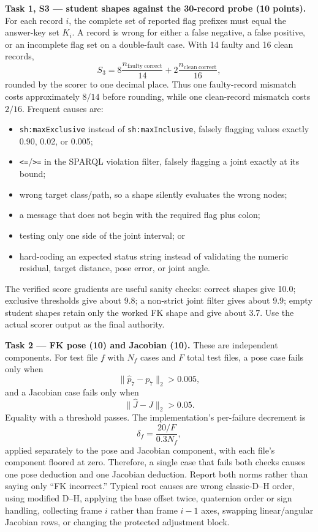 \documentclass[11pt]{article}
\newcommand{\code}[1]{\nolinkurl{#1}}
\begin{document}
\begin{tutornote}
\medskip
\textbf{Task 1, S3 --- student shapes against the 30-record probe (10 points).}
For each record \(i\), the complete set of reported flag prefixes must equal
the answer-key set \(K_i\). A record is wrong for either a false negative, a
false positive, or an incomplete flag set on a double-fault case. With 14
faulty and 16 clean records,
\[
S_3=8\frac{n_{\mathrm{faulty\ correct}}}{14}
   +2\frac{n_{\mathrm{clean\ correct}}}{16},
\]
rounded by the scorer to one decimal place. Thus one faulty-record mismatch
costs approximately \(8/14\) before rounding, while one clean-record mismatch
costs \(2/16\). Frequent causes are:
\begin{itemize}
  \item \code{sh:maxExclusive} instead of \code{sh:maxInclusive}, falsely
    flagging values exactly 0.90, 0.02, or 0.005;
  \item \code{<=}/\code{>=} in the SPARQL violation filter, falsely flagging a
    joint exactly at its bound;
  \item wrong target class/path, so a shape silently evaluates the wrong nodes;
  \item a message that does not begin with the required flag plus colon;
  \item testing only one side of the joint interval; or
  \item hard-coding an expected status string instead of validating the numeric
    residual, target distance, pose error, or joint angle.
\end{itemize}
The verified score gradients are useful sanity checks: correct shapes give
10.0; exclusive thresholds give about 9.8; a non-strict joint filter gives
about 9.9; empty student shapes retain only the worked FK shape and give about
3.7. Use the actual scorer output as the final authority.

\medskip
\textbf{Task 2 --- FK pose (10) and Jacobian (10).}
These are independent components. For test file \(f\) with \(N_f\) cases and
\(F\) total test files, a pose case fails only when
\[
\lVert\hat p_7-p_7\rVert_2>0.005,
\]
and a Jacobian case fails only when
\[
\lVert\hat J-J\rVert_2>0.05.
\]
Equality with a threshold passes. The implementation's per-failure decrement
is
\[
\delta_f=\frac{20/F}{0.3N_f},
\]
applied separately to the pose and Jacobian component, with each file's
component floored at zero. Therefore, a single case that fails both checks
causes one pose deduction and one Jacobian deduction. Report both norms rather
than saying only ``FK incorrect.'' Typical root causes are wrong classic-D--H
order, using modified D--H, applying the base offset twice, quaternion order or
sign handling, collecting frame \(i\) rather than frame \(i-1\) axes, swapping
linear/angular Jacobian rows, or changing the protected adjustment block.


\end{tutornote}
\end{document}

